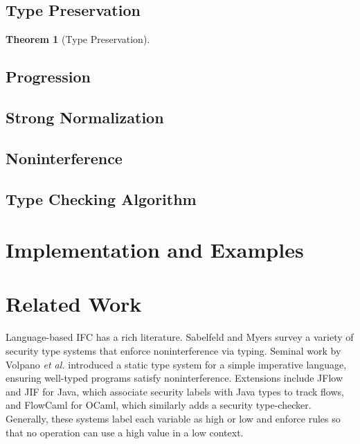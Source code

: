 \documentclass[conference]{IEEEtran}
\newtheorem{theorem}{Theorem}
\begin{document}
\subsection{Type Preservation}
\begin{theorem}[Type Preservation]
	
\end{theorem}

\subsection{Progression}

\subsection{Strong Normalization}

\subsection{Noninterference}

\subsection{Type Checking Algorithm}

\section{Implementation and Examples}

\section{Related Work}

Language-based IFC has a rich literature. Sabelfeld and Myers \cite{sabelfeld2003language} survey a variety of security type systems that enforce noninterference via typing. Seminal work by Volpano \emph{et al.} \cite{volpano1996sound} introduced a static type system for a simple imperative language, ensuring well-typed programs satisfy noninterference. Extensions include JFlow \cite{myers1999jflow} and JIF \cite{pullicino2014jif} for Java, which associate security labels with Java types to track flows, and FlowCaml \cite{simonet2003flow} for OCaml, which similarly adds a security type-checker. Generally, these systems label each variable as high or low and enforce rules so that no operation can use a high value in a low context.
\end{document}
